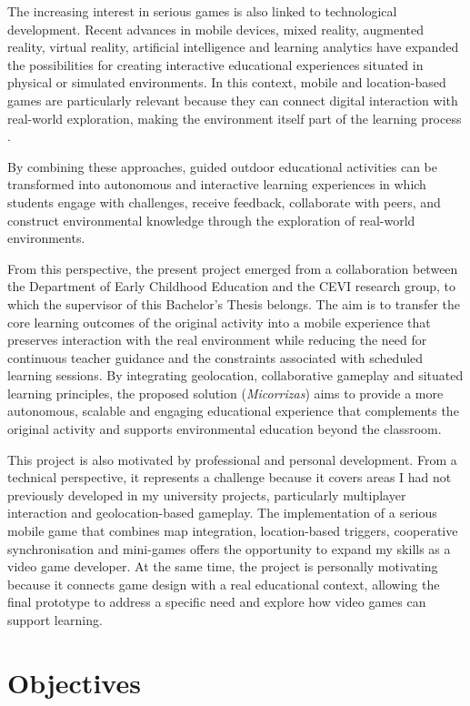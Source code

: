 The increasing interest in serious games is also linked to technological development. Recent advances in mobile devices, mixed reality, augmented reality, virtual reality, artificial intelligence and learning analytics have expanded the possibilities for creating interactive educational experiences situated in physical or simulated environments. In this context, mobile and location-based games are particularly relevant because they can connect digital interaction with real-world exploration, making the environment itself part of the learning process \cite{gomez2019mixed, hands2026serious}.

By combining these approaches, guided outdoor educational activities can be transformed into autonomous and interactive learning experiences in which students engage with challenges, receive feedback, collaborate with peers, and construct environmental knowledge through the exploration of real-world environments.

From this perspective, the present project emerged from a collaboration between the Department of Early Childhood Education and the CEVI research group, to which the supervisor of this Bachelor’s Thesis belongs. The aim is to transfer the core learning outcomes of the original activity into a mobile experience that preserves interaction with the real environment while reducing the need for continuous teacher guidance and the constraints associated with scheduled learning sessions. By integrating geolocation, collaborative gameplay and situated learning principles, the proposed solution (\textit{Micorrizas}) aims to provide a more autonomous, scalable and engaging educational experience that complements the original activity and supports environmental education beyond the classroom.

This project is also motivated by professional and personal development. From a technical perspective, it represents a challenge because it covers areas I had not previously developed in my university projects, particularly multiplayer interaction and geolocation-based gameplay. The implementation of a serious mobile game that combines map integration, location-based triggers, cooperative synchronisation and mini-games offers the opportunity to expand my skills as a video game developer. At the same time, the project is personally motivating because it connects game design with a real educational context, allowing the final prototype to address a specific need and explore how video games can support learning.

\section{Objectives}

